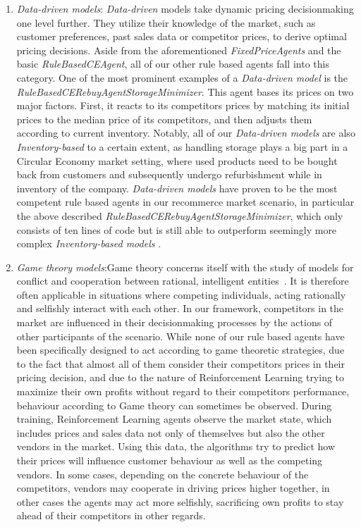 \begin{enumerate}
	\item \emph{Data-driven models}: \emph{Data-driven} models take dynamic pricing decisionmaking one level further. They utilize their knowledge of the market, such as customer preferences, past sales data or competitor prices, to derive optimal pricing decisions. Aside from the aforementioned \emph{FixedPriceAgents} and the basic \emph{RuleBasedCEAgent}, all of our other rule based agents fall into this category. One of the most prominent examples of a \emph{Data-driven model} is the \emph{RuleBasedCERebuyAgentStorageMinimizer}. This agent bases its prices on two major factors. First, it reacts to its competitors prices by matching its initial prices to the median price of its competitors, and then adjusts them according to current inventory. Notably, all of our \emph{Data-driven models} are also \emph{Inventory-based} to a certain extent, as handling storage plays a big part in a Circular Economy market setting, where used products need to be bought back from customers and subsequently undergo refurbishment while in inventory of the company. \emph{Data-driven models} have proven to be the most competent rule based agents in our recommerce market scenario, in particular the above described \emph{RuleBasedCERebuyAgentStorageMinimizer}, which only consists of ten lines of code but is still able to outperform seemingly more complex \emph{Inventory-based models} .

	\item \emph{Game theory models}:\label{bullet:GameTheory}Game theory concerns itself with the study of models for conflict and cooperation between rational, intelligent entities~\cite{GameTheory}. It is therefore often applicable in situations where competing individuals, acting rationally and selfishly interact with each other. In our framework, competitors in the market are influenced in their decisionmaking processes by the actions of other participants of the scenario. While none of our rule based agents have been specifically designed to act according to game theoretic strategies, due to the fact that almost all of them consider their competitors prices in their pricing decision, and due to the nature of Reinforcement Learning trying to maximize their own profits without regard to their competitors performance, behaviour according to Game theory can sometimes be observed.  During training, Reinforcement Learning agents observe the market state, which includes prices and sales data not only of themselves but also the other vendors in the market. Using this data, the algorithms try to predict how their prices will influence customer behaviour as well as the competing vendors. In some cases, depending on the concrete behaviour of the competitors, vendors may cooperate in driving prices higher together, in other cases the agents may act more selfishly, sacrificing own profits to stay ahead of their competitors in other regards. 


\end{enumerate}
